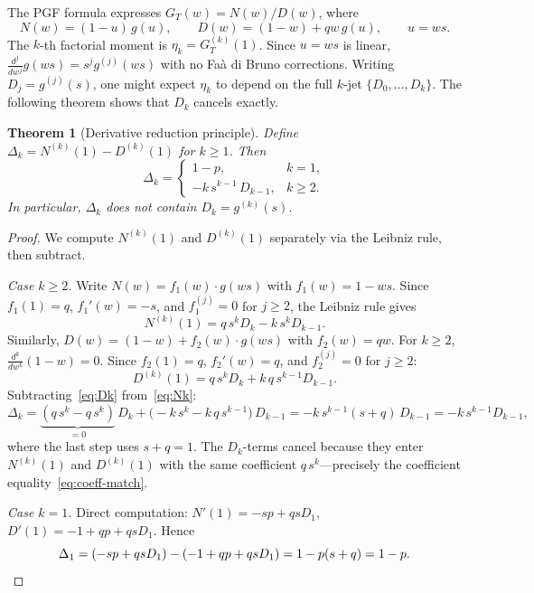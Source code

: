 \documentclass[11pt]{article}
\theoremstyle{plain}
\newtheorem{theorem}{Theorem}[section]
\theoremstyle{definition}
\theoremstyle{remark}
\begin{document}
\medskip

The PGF formula expresses $G_T(w) = N(w)/D(w)$, where\label{sec:drp}
\begin{equation}\label{eq:ND-def}
  N(w) = (1-u)\,g(u), \qquad D(w) = (1-w) + qw\,g(u), \qquad u = ws.
\end{equation}
The $k$-th factorial moment is $\eta_k = G_T^{(k)}(1)$.  Since $u = ws$ is linear, $\frac{d^j}{dw^j} g(ws) = s^j g^{(j)}(ws)$ with no Fa\`a di Bruno corrections.  Writing $D_j = g^{(j)}(s)$, one might expect $\eta_k$ to depend on the full $k$-jet $\{D_0, \ldots, D_k\}$.  The following theorem shows that $D_k$ cancels exactly.

\begin{theorem}[Derivative reduction principle]\label{thm:drp}
Define $\Delta_k = N^{(k)}(1) - D^{(k)}(1)$ for $k \geq 1$.  Then
\begin{equation}\label{eq:Delta}
  \Delta_k =
  \begin{cases}
    1-p, & k=1, \\[3pt]
    -k\,s^{k-1}\,D_{k-1}, & k \geq 2.
  \end{cases}
\end{equation}
In particular, $\Delta_k$ does not contain $D_k = g^{(k)}(s)$.
\end{theorem}

\begin{proof}
We compute $N^{(k)}(1)$ and $D^{(k)}(1)$ separately via the Leibniz rule, then subtract.

\medskip
\noindent\emph{Case $k \geq 2$.}\;
Write $N(w) = f_1(w) \cdot g(ws)$ with $f_1(w) = 1 - ws$.  Since $f_1(1) = q$, $f_1'(w) = -s$, and $f_1^{(j)} = 0$ for $j \geq 2$, the Leibniz rule gives
\begin{equation}\label{eq:Nk}
  N^{(k)}(1) = q\,s^k D_k - k\,s^k D_{k-1}.
\end{equation}
Similarly, $D(w) = (1-w) + f_2(w) \cdot g(ws)$ with $f_2(w) = qw$.  For $k \geq 2$, $\frac{d^k}{dw^k}(1-w) = 0$.  Since $f_2(1) = q$, $f_2'(w) = q$, and $f_2^{(j)} = 0$ for $j \geq 2$:
\begin{equation}\label{eq:Dk}
  D^{(k)}(1) = q\,s^k D_k + k\,q\,s^{k-1} D_{k-1}.
\end{equation}
Subtracting~\eqref{eq:Dk} from~\eqref{eq:Nk}:
\[
  \Delta_k = \underbrace{(q\,s^k - q\,s^k)}_{= 0}\,D_k
  + \bigl(-k\,s^k - k\,q\,s^{k-1}\bigr)\,D_{k-1}
  = -k\,s^{k-1}(s+q)\,D_{k-1}
  = -k\,s^{k-1} D_{k-1},
\]
where the last step uses $s + q = 1$.  The $D_k$-terms cancel because they enter $N^{(k)}(1)$ and $D^{(k)}(1)$ with the same coefficient $q\,s^k$---precisely the coefficient equality~\eqref{eq:coeff-match}.

\medskip
\noindent\emph{Case $k = 1$.}\;
Direct computation: $N'(1) = -sp + qsD_1$, $D'(1) = -1 + qp + qsD_1$.  Hence
\[
  \Delta_1 = (-sp + qsD_1) - (-1 + qp + qsD_1) = 1 - p(s+q) = 1 - p. \qedhere
\]
\end{proof}
\end{document}
